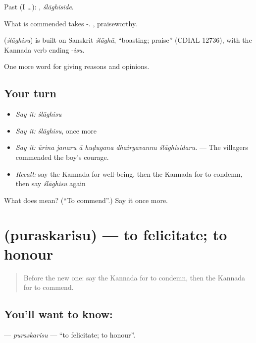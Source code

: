 Past (I …): , \emph{ślāghiside}.

What is commended takes -. , praiseworthy.

\begin{cousinweb}
\textbf{} (\emph{ślāghisu}) is built on Sanskrit \emph{ślāghā}, \textquotedblleft{}boasting; praise\textquotedblright{} (CDIAL 12736), with the Kannada verb ending -\emph{isu}.
\end{cousinweb}

\begin{grammarlens}[title={What you've built}]
One more word for giving reasons and opinions.
\end{grammarlens}

\subsection*{Your turn}
\begin{itemize}
\raggedright
  \item \emph{Say it:} \emph{ślāghisu}
  \item \emph{Say it:} \emph{ślāghisu}, once more
  \item \emph{Say it:} \emph{ūrina janaru ā huḍugana dhairyavannu ślāghisidaru.} — The villagers commended the boy's courage.
  \item \emph{Recall:} say the Kannada for well-being, then the Kannada for to condemn, then say \emph{ślāghisu} again
\end{itemize}

\begin{tcolorbox}[breakable,colback=teal!4,colframe=teal!35!black,title={Before you move on}]
What does  mean? (\textquotedblleft{}To commend\textquotedblright{}.) Say it once more.
\end{tcolorbox}
\section[\texorpdfstring{\kn{ಪುರಸ್ಕರಿಸು} (puraskarisu)}{ಪುರಸ್ಕರಿಸು (puraskarisu)}]{ (puraskarisu) — to felicitate; to honour}

\label{lesson:KA-C389-puraskarisu}



\begin{quote}
Before the new one: say the Kannada for to condemn, then the Kannada for to commend.
\end{quote}

\subsection*{You'll want to know: }
\textbf{} — \emph{puraskarisu} — \textquotedblleft{}to felicitate; to honour\textquotedblright{}.

